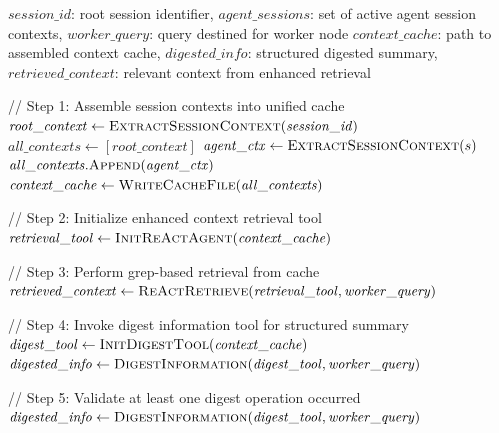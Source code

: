 \documentclass{article}
\begin{document}
\begin{algorithm}[t]
\caption{TINYCUA Information Digester}
\label{alg:information-digester}
\begin{algorithmic}[1]
\Require $\mathit{session\_id}$: root session identifier, $\mathit{agent\_sessions}$: set of active agent session contexts, $\mathit{worker\_query}$: query destined for worker node
\Ensure $\mathit{context\_cache}$: path to assembled context cache, $\mathit{digested\_info}$: structured digested summary, $\mathit{retrieved\_context}$: relevant context from enhanced retrieval

// Step 1: Assemble session contexts into unified cache
\State $\mathit{root\_context} \gets \textsc{ExtractSessionContext}(\mathit{session\_id})$
\State $\mathit{all\_contexts} \gets [\mathit{root\_context}]$
    \State $\mathit{agent\_ctx} \gets \textsc{ExtractSessionContext}(s)$
    \State $\mathit{all\_contexts}.\textsc{Append}(\mathit{agent\_ctx})$
\EndFor
\State $\mathit{context\_cache} \gets \textsc{WriteCacheFile}(\mathit{all\_contexts})$

// Step 2: Initialize enhanced context retrieval tool
\State $\mathit{retrieval\_tool} \gets \textsc{InitReActAgent}(\mathit{context\_cache})$

// Step 3: Perform grep-based retrieval from cache
\State $\mathit{retrieved\_context} \gets \textsc{ReActRetrieve}(\mathit{retrieval\_tool}, \mathit{worker\_query})$

// Step 4: Invoke digest information tool for structured summary
\State $\mathit{digest\_tool} \gets \textsc{InitDigestTool}(\mathit{context\_cache})$
\State $\mathit{digested\_info} \gets \textsc{DigestInformation}(\mathit{digest\_tool}, \mathit{worker\_query})$

// Step 5: Validate at least one digest operation occurred
    \State $\mathit{digested\_info} \gets \textsc{DigestInformation}(\mathit{digest\_tool}, \mathit{worker\_query})$
\EndIf

\end{algorithmic}
\end{algorithm}
\end{document}
